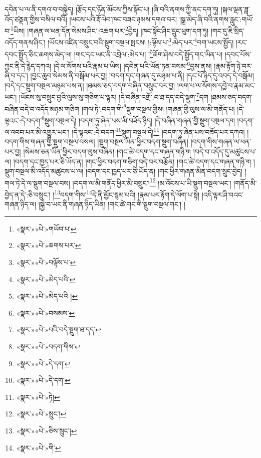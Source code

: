 དབེན་པ་ལ་ནི་དགའ་བ་བསྐྱེད། །རྩོད་དང་ཉོན་མོངས་ཀྱིས་སྟོང་པ། །ཞི་བའི་ནགས་ཀྱི་ནང་དག་ཏུ། །སྐལ་ལྡན་ཟླ་འོད་ཙནྡན་གྱིས་བསིལ་བའི། །ཡངས་པའི་རྡོ་ལེབ་ཁང་བཟང་ཉམས་དགའ་བར། །སྒྲ་མེད་ཞི་བའི་ནགས་རླུང་:གཡོ་བ་\footnote{«སྣར་»«པེ་»གཡོབ་པ་}ཡིས། །གཞན་ལ་ཕན་དོན་སེམས་ཤིང་:འཆག་པར་\footnote{«སྣར་»«པེ་»ཆགས་པར་}བྱེད། །ཁང་སྟོང་ཤིང་དྲུང་ཕུག་དག་ཏུ། །གང་དུ་ཇི་སྲིད་འདོད་གནས་ཤིང་། །ཡོངས་འཛིན་བསྲུང་བའི་སྡུག་བསྔལ་སྤངས། །:ལྟོས་པ་\footnote{«སྣར་»«པེ་»བལྟོས་པ་}:མེད་པར་\footnote{«སྣར་»«པེ་»མེད་པའི་}བག་ཡངས་སྤྱོད། །རང་དབང་སྤྱོད་ཅིང་ཆགས་མེད་ལ། །གང་དང་ཡང་ནི་འབྲེལ་:མེད་པ། །\footnote{«སྣར་»«པེ་»མེད་པའི །}ཆོག་ཤེས་བདེ་སྤྱོད་གང་ཡིན་པ། །དབང་པོས་ཀྱང་ནི་དེ་རྙེད་དཀའ། །དེ་ལ་སོགས་པའི་རྣམ་པ་ཡིས། །དབེན་པའི་ཡོན་ཏན་བསམ་\footnote{«སྣར་»«པེ་»བསམས་}བྱས་ནས། །རྣམ་རྟོག་ཉེ་བར་ཞི་བ་དང་། །བྱང་ཆུབ་སེམས་ནི་བསྒོམ་པར་བྱ། །བདག་དང་གཞན་དུ་མཉམ་པ་ནི། །དང་པོ་ཉིད་དུ་འབད་དེ་བསྒོམ། །བདེ་དང་སྡུག་བསྔལ་མཉམ་པས་ན། །ཐམས་ཅད་བདག་བཞིན་བསྲུང་བར་བྱ། །ལག་པ་ལ་སོགས་དབྱེ་བ་རྣམ་མང་ཡང་། །ཡོངས་སུ་བསྲུང་བྱའི་ལུས་སུ་གཅིག་པ་ལྟར། །དེ་བཞིན་འགྲོ་:བ་ཐ་དད་བདེ་སྡུག་\footnote{«སྣར་»«པེ་»པའི་བདེ་སྡུག་ཐ་དད་}དག །ཐམས་ཅད་བདག་བཞིན་བདེ་བ་འདོད་མཉམ་གཅིག །གལ་ཏེ་:བདག་གི་\footnote{«སྣར་»«པེ་»བདག་གིས་}སྡུག་བསྔལ་གྱིས། །གཞན་གྱི་ལུས་ལ་མི་གནོད་པ། །དེ་ལྟའང་:དེ་བདག་\footnote{«སྣར་»«པེ་»དེ་དག་}སྡུག་བསྔལ་དེ། །བདག་ཏུ་ཞེན་པས་མི་བཟོད་ཉིད། །དེ་བཞིན་གཞན་གྱི་སྡུག་བསྔལ་དག །བདག་ལ་འབབ་པར་མི་འགྱུར་ཡང་། །དེ་ལྟའང་:དེ་བདག་\footnote{«སྣར་»«པེ་»དེ་དག་}སྡུག་བསྔལ་དེ།\footnote{«སྣར་»«པེ་»ཏེ།} །བདག་ཏུ་ཞེན་པས་བཟོད་པར་དཀའ། །བདག་གིས་གཞན་གྱི་སྡུག་བསྔལ་བསལ། །སྡུག་བསྔལ་ཡིན་ཕྱིར་བདག་སྡུག་བཞིན། །བདག་གིས་གཞན་ལ་ཕན་པར་བྱ། །སེམས་ཅན་ཡིན་ཕྱིར་བདག་ལུས་བཞིན། །གང་ཚེ་བདག་དང་གཞན་གཉི་ག །བདེ་བ་འདོད་དུ་མཚུངས་པ་ལ། །བདག་དང་ཁྱད་པར་ཅི་ཡོད་ན། །གང་ཕྱིར་བདག་གཅིག་བདེ་བར་བརྩོན། །གང་ཚེ་བདག་དང་གཞན་གཉི་ག །སྡུག་བསྔལ་མི་འདོད་མཚུངས་པ་ལ། །བདག་དང་ཁྱད་པར་ཅི་ཡོད་ན། །གང་ཕྱིར་གཞན་མིན་བདག་སྲུང་བྱེད། །གལ་ཏེ་དེ་ལ་སྡུག་བསྔལ་བས། །བདག་ལ་མི་གནོད་ཕྱིར་མི་བསྲུང་།\footnote{«སྣར་»«པེ་»སྲུང་།} །མ་འོངས་པ་ཡི་སྡུག་བསྔལ་ཡང་། །གནོད་མི་བྱེད་ན་དེ་:ཅི་བསྲུང་། །\footnote{«སྣར་»«པེ་»ཅིས་སྲུང་། }བདག་གིས་\footnote{«སྣར་»«པེ་»གི་}དེ་ནི་མྱོང་སྙམ་པའི། །རྣམ་པར་རྟོག་དེ་ལོག་པ་སྟེ། །འདི་ལྟར་ཤི་བའང་གཞན་ཉིད་ལ། །སྐྱེ་བ་ཡང་ནི་གཞན་ཉིད་ཡིན། །གང་ཚེ་གང་གི་སྡུག་བསྔལ་གང་། །
